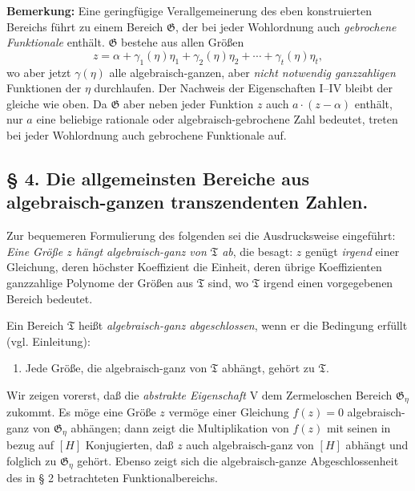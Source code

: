 \textbf{Bemerkung:} Eine geringfügige Verallgemeinerung des eben konstruierten
Bereichs führt zu einem Bereich $\mathfrak G$, der bei jeder Wohlordnung auch
\emph{gebrochene Funktionale} enthält. $\mathfrak G$ bestehe aus allen Größen
\[
 z=\alpha+\gamma_1(\eta)\eta_1+\gamma_2(\eta)\eta_2
      +\cdots+\gamma_t(\eta)\eta_t,
\]
wo aber jetzt $\gamma(\eta)$ alle algebraisch-ganzen, aber \emph{nicht
notwendig ganzzahligen} Funktionen der $\eta$ durchlaufen. Der Nachweis der
Eigenschaften I--IV bleibt der gleiche wie oben. Da $\mathfrak G$ aber neben
jeder Funktion $z$ auch $a\cdot(z-\alpha)$ enthält, nur $a$ eine beliebige
rationale oder algebraisch-gebrochene Zahl bedeutet, treten bei jeder Wohlordnung
auch gebrochene Funktionale auf.

\subsection*{§ 4. Die allgemeinsten Bereiche aus algebraisch-ganzen
transzendenten Zahlen.}

Zur bequemeren Formulierung des folgenden sei die Ausdrucksweise eingeführt:
\glqq{}\emph{Eine Größe $z$ hängt algebraisch-ganz von $\mathfrak T$ ab}\grqq{}, die besagt:
$z$ genügt \emph{irgend} einer Gleichung, deren höchster Koeffizient die Einheit,
deren übrige Koeffizienten ganzzahlige Polynome der Größen aus $\mathfrak T$
sind, wo $\mathfrak T$ irgend einen vorgegebenen Bereich bedeutet.

Ein Bereich $\mathfrak T$ heißt \emph{algebraisch-ganz abgeschlossen}, wenn er
die Bedingung erfüllt (vgl. Einleitung):
\begin{enumerate}
\item[V.] Jede Größe, die algebraisch-ganz von $\mathfrak T$ abhängt, gehört zu
$\mathfrak T$.
\end{enumerate}

Wir zeigen vorerst, daß die \emph{abstrakte Eigenschaft} V dem Zermeloschen
Bereich $\mathfrak G_\eta$ zukommt. Es möge eine Größe $z$ vermöge einer
Gleichung $f(z)=0$ algebraisch-ganz von $\mathfrak G_\eta$ abhängen; dann zeigt
die Multiplikation von $f(z)$ mit seinen in bezug auf $[H]$ Konjugierten, daß
$z$ auch algebraisch-ganz von $[H]$ abhängt und folglich zu $\mathfrak G_\eta$
gehört. Ebenso zeigt sich die algebraisch-ganze Abgeschlossenheit des in § 2
betrachteten Funktionalbereichs.

